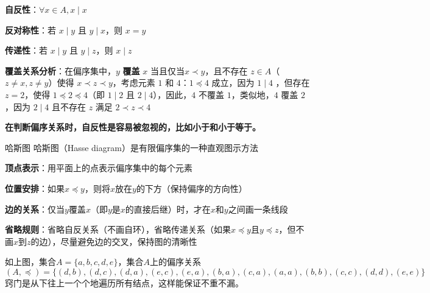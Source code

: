 \textbf{自反性}：$\forall x \in A, x \mid x$

\textbf{反对称性}：若 $x \mid y$ 且 $y \mid x$，则 $x = y$

\textbf{传递性}：若 $x \mid y$ 且 $y \mid z$，则 $x \mid z$

\textbf{覆盖关系分析}：在偏序集中，$y$ \textbf{覆盖} $x$ 当且仅当$x \prec y$，且不存在 $z \in A$（$z \neq x, z \neq y$）使得 $x \prec z \prec y$，考虑元素 $1$ 和 $4$：$1 \preccurlyeq 4$ 成立，因为 $1 \mid 4$
，但存在 $z = 2$，使得 $1 \preccurlyeq 2 \preccurlyeq 4$（即 $1 \mid 2$ 且 $2 \mid 4$），因此，$4$ 不覆盖 $1$，类似地，$4$ 覆盖 $2$，因为 $2 \mid 4$ 且不存在 $z$ 满足 $2 \prec z \prec 4$

\textbf{在判断偏序关系时，自反性是容易被忽视的，比如小于和小于等于。}
\begin{definition}{哈斯图}{}
哈斯图（Hasse diagram）是有限偏序集的一种直观图示方法

\textbf{顶点表示}：用平面上的点表示偏序集中的每个元素

\textbf{位置安排}：如果$x \preccurlyeq y$，则将$x$放在$y$的下方（保持偏序的方向性）

\textbf{边的关系}：仅当$y$覆盖$x$（即$y$是$x$的直接后继）时，才在$x$和$y$之间画一条线段

\textbf{省略规则}：省略自反关系（不画自环），省略传递关系（如果$x \preccurlyeq y$且$y \preccurlyeq z$，但不画$x$到$z$的边），尽量避免边的交叉，保持图的清晰性
\end{definition}
\begin{figure}[!ht]
\centering
{}%
\end{figure}
如上图，集合$A=\{a,b,c,d,e\}$，集合$A$上的偏序关系\[(A,\preccurlyeq)=\{(d,b),(d,c),(d,a),(e,c),(e,a),(b,a),(c,a),(a,a),(b,b),(c,c),(d,d),(e,e)\}\]窍门是从下往上一个个地遍历所有结点，这样能保证不重不漏。

